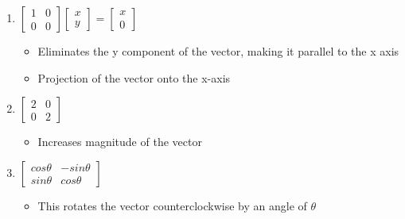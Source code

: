 \documentclass[11pt]{article}
\begin{document}
\begin{enumerate}
\begin{enumerate}
\item \(\begin{bmatrix}1&0\\0&0\end{bmatrix}\begin{bmatrix}x\\y\end{bmatrix} = \begin{bmatrix}x\\0\end{bmatrix}\)
\begin{itemize}
\item Eliminates the y component of the vector, making it parallel to the x axis
\item Projection of the vector onto the x-axis
\end{itemize}

\item \(\begin{bmatrix}2&0\\0&2\end{bmatrix}\)
\begin{itemize}
\item Increases magnitude of the vector
\end{itemize}

\item \(\begin{bmatrix}cos\theta{}&-sin\theta{}\\sin\theta{}&cos\theta{}\end{bmatrix}\)
\begin{itemize}
\item This rotates the vector counterclockwise by an angle of \(\theta\)
\end{itemize}
\end{enumerate}
\end{enumerate}
\end{document}

